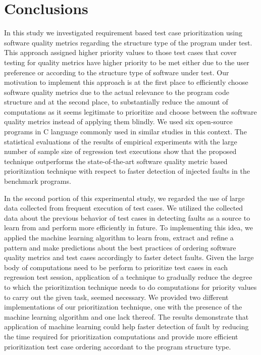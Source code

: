 \documentclass{sig-alternate}
\begin{document}
\section{Conclusions}
In this study we investigated requirement based test case prioritization using software quality metrics regarding the structure type of the program under test. This approach assigned higher priority values to those test cases that cover testing for quality metrics have higher priority to be met either due to the user preference or according to the structure type of software under test. Our motivation to implement this approach is at the first place to efficiently choose software quality metrics due to the actual relevance to the program code structure and at the second place, to substantially reduce the amount of computations as it seems legitimate to prioritize and choose between the software quality metrics instead of applying them blindly. We used six open-source programs in C language commonly used in similar studies in this context. The statistical evaluations of the results of empirical experiments with the large number of sample size of regression test executions show that the proposed technique outperforms the state-of-the-art software quality metric based prioritization technique with respect to faster detection of injected faults in the benchmark programs.

In the second portion of this experimental study, we regarded the use of large data collected from frequent execution of test cases. We utilized the collected data about the previous behavior of test cases in detecting faults as a source to learn from and perform more efficiently in future. To implementing this idea, we applied the machine learning algorithm to learn from, extract and refine a pattern and make predictions about the best practices of ordering software quality metrics and test cases accordingly to faster detect faults. Given the large body of computations need to be perform to prioritize test cases in each regression test session, application of a technique to gradually reduce the degree to which the prioritization technique needs to do computations for priority values to carry out the given task, seemed necessary. We provided two different implementations of our prioritization technique, one with the presence of the machine learning algorithm and one lack thereof. The results demonstrate that application of machine learning could help faster detection of fault by reducing the time required for prioritization computations and provide more efficient prioritization test case ordering accordant to the program structure type.
 
\end{document}
